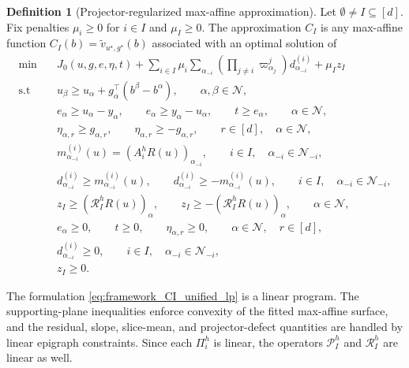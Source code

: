 \documentclass[11pt,letterpaper]{article}
\theoremstyle{definition}
\newtheorem{definition}[theorem]{Definition}
\theoremstyle{remark}
\begin{document}
\begin{definition}[Projector-regularized max-affine approximation]
\label{def:framework_CI_unified}
Let $\emptyset\neq I\subseteq[d]$. Fix penalties $\mu_i\ge0$ for $i\in I$ and
$\mu_I\ge0$. The approximation $C_I$ is any max-affine function
$C_I(b)=\widetilde v_{u^\star,g^\star}(b)$ associated with an optimal solution
of
\begin{equation}
\label{eq:framework_CI_unified_lp}
\begin{aligned}
\min\quad&
J_0(u,g,e,\eta,t)
+
\sum_{i\in I}
\mu_i
\sum_{\alpha_{-i}}
\left(
\prod_{j\neq i}\varpi_{\alpha_j}^j
\right)
d_{\alpha_{-i}}^{(i)}
+
\mu_I z_I
\\
\text{s.t } \quad&
u_\beta
\ge
u_\alpha
+
g_\alpha^\top
\left(
b^\beta-b^\alpha
\right),
\qquad
\alpha,\beta\in\mathcal N,
\\
&
e_\alpha
\ge
u_\alpha-y_\alpha,
\qquad
e_\alpha
\ge
y_\alpha-u_\alpha,
\qquad
t\ge e_\alpha,
\qquad
\alpha\in\mathcal N,
\\
&
\eta_{\alpha,r}
\ge
g_{\alpha,r},
\qquad
\eta_{\alpha,r}
\ge
-g_{\alpha,r},
\qquad
r\in[d],
\quad
\alpha\in\mathcal N,
\\
&
m_{\alpha_{-i}}^{(i)}(u)
=
\left(
A_i^hR(u)
\right)_{\alpha_{-i}},
\qquad
i\in I,
\quad
\alpha_{-i}\in\mathcal N_{-i},
\\
&
d_{\alpha_{-i}}^{(i)}
\ge
m_{\alpha_{-i}}^{(i)}(u),
\qquad
d_{\alpha_{-i}}^{(i)}
\ge
-m_{\alpha_{-i}}^{(i)}(u),
\qquad
i\in I,
\quad
\alpha_{-i}\in\mathcal N_{-i},
\\
&
z_I
\ge
\left(
\mathcal R_I^hR(u)
\right)_\alpha,
\qquad
z_I
\ge
-\left(
\mathcal R_I^hR(u)
\right)_\alpha,
\qquad
\alpha\in\mathcal N,
\\
&
e_\alpha\ge0,
\qquad
t\ge0,
\qquad
\eta_{\alpha,r}\ge0,
\qquad
\alpha\in\mathcal N,
\quad
r\in[d],
\\
&
d_{\alpha_{-i}}^{(i)}\ge0,
\qquad
i\in I,
\quad
\alpha_{-i}\in\mathcal N_{-i},
\\
&
z_I\ge0.
\end{aligned}
\end{equation}


\end{definition}

The formulation \eqref{eq:framework_CI_unified_lp} is a linear program. The
supporting-plane inequalities enforce convexity of the fitted max-affine
surface, and the residual, slope, slice-mean, and projector-defect quantities
are handled by linear epigraph constraints. Since each $\Pi_i^h$ is linear,
the operators $\mathcal P_I^h$ and $\mathcal R_I^h$ are linear as well.
\end{document}
